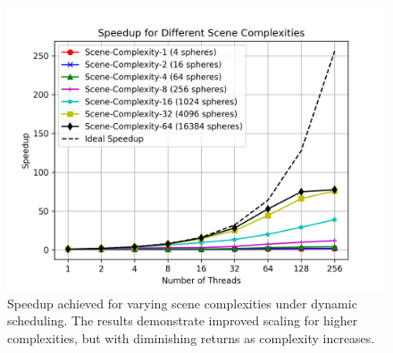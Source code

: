 \begin{figure}
    \centering
    \includegraphics[width=1.0\linewidth]{images/scene_complexity_speedup_comparison.png}
    \caption{Speedup achieved for varying scene complexities under dynamic scheduling. The results demonstrate improved scaling for higher complexities, but with diminishing returns as complexity increases.}
    \label{fig:scene-complexity-speedup}
\end{figure}
\FloatBarrier